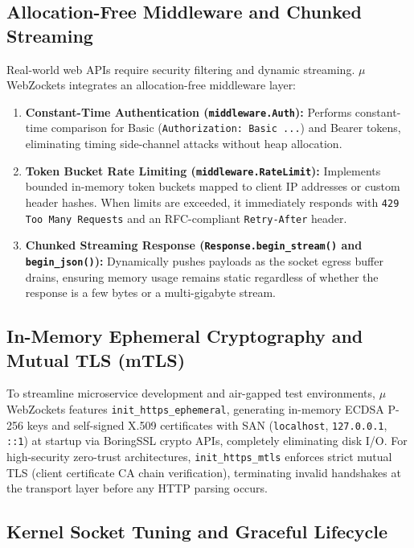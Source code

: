 \documentclass[journal]{IEEEtran}
\begin{document}
\subsection{Allocation-Free Middleware and Chunked Streaming}

Real-world web APIs require security filtering and dynamic streaming. \ensuremath{\mu}WebZockets integrates an allocation-free middleware layer:
\begin{enumerate}
    \item \textbf{Constant-Time Authentication (\texttt{middleware.Auth}):} Performs constant-time comparison for Basic (\texttt{Authorization: Basic ...}) and Bearer tokens, eliminating timing side-channel attacks without heap allocation.
    \item \textbf{Token Bucket Rate Limiting (\texttt{middleware.RateLimit}):} Implements bounded in-memory token buckets mapped to client IP addresses or custom header hashes. When limits are exceeded, it immediately responds with \texttt{429 Too Many Requests} and an RFC-compliant \texttt{Retry-After} header.
    \item \textbf{Chunked Streaming Response (\texttt{Response.begin\_stream()} and \texttt{begin\_json()}):} Dynamically pushes payloads as the socket egress buffer drains, ensuring memory usage remains static regardless of whether the response is a few bytes or a multi-gigabyte stream.
\end{enumerate}

\subsection{In-Memory Ephemeral Cryptography and Mutual TLS (mTLS)}

To streamline microservice development and air-gapped test environments, \ensuremath{\mu}WebZockets features \texttt{init\_https\_ephemeral}, generating in-memory ECDSA P-256 keys and self-signed X.509 certificates with SAN (\texttt{localhost}, \texttt{127.0.0.1}, \texttt{::1}) at startup via BoringSSL crypto APIs, completely eliminating disk I/O. For high-security zero-trust architectures, \texttt{init\_https\_mtls} enforces strict mutual TLS (client certificate CA chain verification), terminating invalid handshakes at the transport layer before any HTTP parsing occurs.

\subsection{Kernel Socket Tuning and Graceful Lifecycle}
\end{document}
